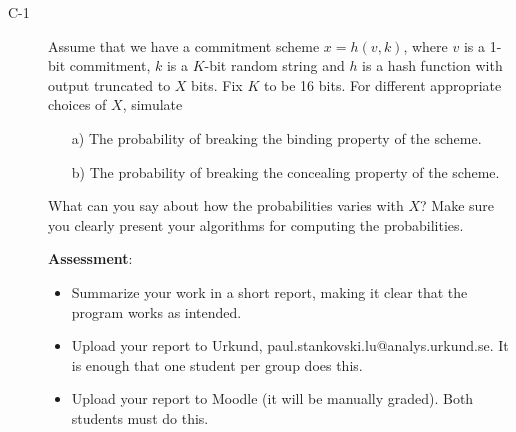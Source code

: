 \documentclass{article}
\begin{document}
\begin{description}
	\item[C-1]{Assume that we have a commitment scheme $x = h(v, k)$, where $v$ is a 1-bit commitment,
    $k$ is a $K$-bit random string and $h$ is a hash function with output truncated to $X$ bits.
    Fix $K$ to be 16 bits. For different appropriate choices of $X$, simulate
    \begin{itemize}
    	\item[a)] The probability of breaking the binding property of the scheme.
        \item[b)] The probability of breaking the concealing property of the scheme.
    \end{itemize}
    What can you say about how the probabilities varies with $X$? Make sure you clearly present
    your algorithms for computing the probabilities.
    
    \textbf{Assessment}:
	\begin{itemize}
    	\item Summarize your work in a short report, making it clear that the program works as intended.
        
		\item Upload your report to Urkund, paul.stankovski.lu@analys.urkund.se. 
        It is enough that one student per group does this.
        
		\item Upload your report to Moodle (it will be manually graded). Both students must do this.
	\end{itemize}}


\end{description}
\end{document}
